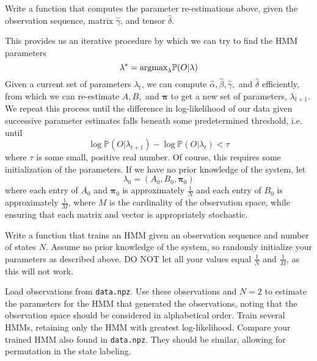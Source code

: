 \begin{problem}
Write a function that computes the parameter re-estimations above, given the observation sequence, matrix $\widehat{\gamma}$, and tensor $\widehat{\delta}$.
\end{problem}

This provides us an iterative procedure by which we can try to find the HMM parameters \begin{equation*}
\lambda^{*} = \mbox{argmax}_{\lambda} \mathbb{P}(O | \lambda)
\end{equation*}
Given a current set of parameters $\lambda_{t}$, we can compute $\widehat{\alpha}, \widehat{\beta}, \widehat{\gamma},$ and $\widehat{\delta}$ efficiently, from which we can re-estimate $A, B,$ and $\mathbf{\pi}$ to get a new set of parameters, $\lambda_{t+1}$. We repeat this process until the difference in log-likelihood of our data given successive parameter estimates falls beneath some predetermined threshold, i.e. until
\begin{equation*}
\log \mathbb{P}(O | \lambda_{t+1}) - \log \mathbb{P}(O | \lambda_{t}) < \tau
\end{equation*}
where $\tau$ is some small, positive real number.
Of course, this requires some initialization of the parameters. If we have no prior knowledge of the system, let 
\begin{equation*}
\lambda_{0} = \left( A_{0}, B_{0}, \mathbf{\pi}_{0} \right)
\end{equation*}
where each entry of $A_{0}$ and $\mathbf{\pi}_{0}$ is approximately $\frac{1}{N}$ and each entry of $B_{0}$ is approximately $\frac{1}{M}$, where $M$ is the cardinality of the observation space, while ensuring that each matrix and vector is appropriately stochastic.

\begin{problem}
Write a function that trains an HMM given an observation sequence and number of states $N$. Assume no prior knowledge of the system, so randomly initialize your parameters as described above. DO NOT let all your values equal $\frac{1}{N}$ and $\frac{1}{M}$, as this will not work.
\end{problem}

\begin{problem}
Load observations from \texttt{data.npz}. Use these observations and $N = 2$ to estimate the parameters for the HMM that generated the observations, noting that the observation space should be considered in alphabetical order. Train several HMMs, retaining only the HMM with greatest log-likelihood. Compare your trained HMM also found in \texttt{data.npz}. They should be similar, allowing for permutation in the state labeling.
\end{problem}